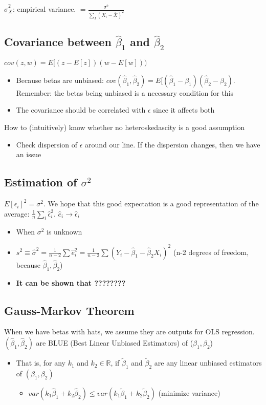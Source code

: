 \documentclass[10pt, oneside]{article}
\newcommand{\R}{\mathbb{R}}
\begin{document}
$\hat \sigma_X ^2$: empirical variance. $=\frac{\sigma^2}{\sum_I (X_i -\bar X)^2}$

\subsection{Covariance between $\hat \beta_1$ and $\hat \beta_2$}
$cov(z,w) = E[(z-E[z])(w-E[w]))$

\begin{itemize}
    \item Because betas are unbiased: $cov(\hat \beta_1,\hat \beta_2)=E[(\hat \beta_1 -\beta_1)(\hat \beta_2 -\beta_2)$. Remember: the betas being unbiased is a necessary condition for this
    \item The covariance should be correlated with $\epsilon$ since it affects both
\end{itemize}

How to (intuitively) know whether no heteroskedascity is a good assumption
\begin{itemize}
    \item Check dispersion of $\epsilon$ around our line. If the dispersion changes, then we have an issue
\end{itemize}

\subsection{Estimation of $\sigma^2$}
$E[\epsilon_i] ^2 = \sigma^2$. We hope that this good expectation is a good representation of the average: $\frac{1}{n} \sum_i \hat \epsilon_i ^2$. $\hat e_i \rightarrow \hat \epsilon_i$
\begin{itemize}
    \item When $\sigma^2$ is unknown
    \item $s^2 \equiv \hat \sigma^2 = \frac{1}{n-2}\sum \hat e_i ^2 = \frac{1}{n-2} \sum(Y_i -\hat \beta_1 -\hat \beta_2 X_i)^2$ (n-2 degrees of freedom, because $\hat \beta_1, \hat \beta_2$)
    \item \textbf{It can be shown that ????????}
\end{itemize}

\subsection{Gauss-Markov Theorem}
When we have betas with hats, we assume they are outputs for OLS regression.
$(\hat \beta_1, \hat \beta_2)$ are BLUE (Best Linear Unbiased Estimators) of ($\beta_1, \beta_2$)
\begin{itemize}
    \item That is, for any $k_1$ and $k_2 \in \R$, if $\tilde \beta_1$ and $\tilde \beta_2$ are any linear unbiased estimators of $(\beta_1,\beta_2)$
    \begin{itemize}
        \item $var(k_1\hat \beta_1 + k_2 \hat \beta_2) \leq var(k_1 \tilde \beta_1 + k_2 \tilde \beta_2)$ (minimize variance)
    \end{itemize}
\end{itemize}
\end{document}
